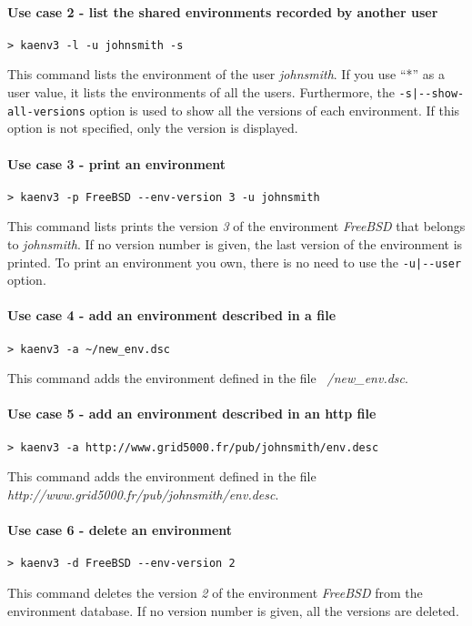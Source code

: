 \documentclass[a4wide,10pt,oneside]{book}
\begin{document}
\paragraph{Use case 2 - list the shared environments recorded by another user}
\begin{verbatim}
> kaenv3 -l -u johnsmith -s
\end{verbatim}
This command lists the environment of the user \textit{johnsmith}. If you use ``*'' as a user value, it lists the environments of all the users. Furthermore, the \texttt{-s|-{}-show-all-versions} option is used to show all the versions of each environment. If this option is not specified, only the version is displayed.

\paragraph{Use case 3 - print an environment}
\begin{verbatim}
> kaenv3 -p FreeBSD --env-version 3 -u johnsmith
\end{verbatim}
This command lists prints the version \textit{3} of the environment \textit{FreeBSD} that belongs to \textit{johnsmith}. If no version number is given, the last version of the environment is printed. To print an environment you own, there is no need to use the \texttt{-u|-{}-user} option.

\paragraph{Use case 4 - add an environment described in a file}
\begin{verbatim}
> kaenv3 -a ~/new_env.dsc
\end{verbatim}
This command adds the environment defined in the file \textit{~/new\_env.dsc}.

\paragraph{Use case 5 - add an environment described in an http file}
\begin{verbatim}
> kaenv3 -a http://www.grid5000.fr/pub/johnsmith/env.desc
\end{verbatim}
This command adds the environment defined in the file \textit{http://www.grid5000.fr/pub/johnsmith/env.desc}.

\paragraph{Use case 6 - delete an environment}
\begin{verbatim}
> kaenv3 -d FreeBSD --env-version 2
\end{verbatim}
This command deletes the version \textit{2} of the environment \textit{FreeBSD} from the environment database. If no version number is given, all the versions are deleted.
\end{document}
